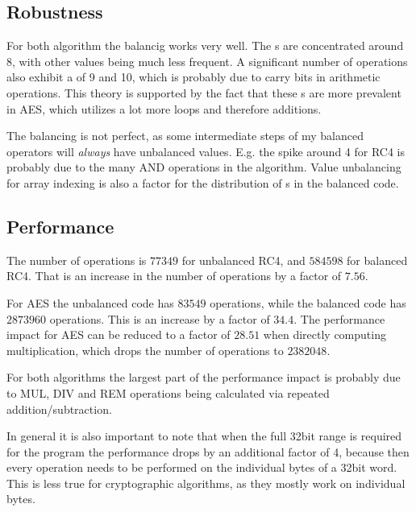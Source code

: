 \subsection{Robustness}
For both algorithm the balancig works very well.
The \hammingw{}s are concentrated around 8, with other values being much less frequent.
A significant number of operations also exhibit a \hammingw{} of 9 and 10, which is probably due to carry bits in arithmetic operations.
This theory is supported by the fact that these \hammingw{}s are more prevalent in AES, which utilizes a lot more loops and therefore additions.

The balancing is not perfect, as some intermediate steps of my balanced operators will \emph{always} have unbalanced values.
E.g. the spike around 4 for RC4 is probably due to the many AND operations in the algorithm.
Value unbalancing for array indexing is also a factor for the distribution of \hammingw{}s in the balanced code.

\subsection{Performance}
The number of operations is $77349$ for unbalanced RC4, and $584598$ for balanced RC4.
That is an increase in the number of operations by a factor of $7.56$.

For AES the unbalanced code has $83549$ operations, while the balanced code has $2873960$ operations.
This is an increase by a factor of $34.4$.
The performance impact for AES can be reduced to a factor of $28.51$ when directly computing multiplication, which drops the number of operations to $2382048$.

For both algorithms the largest part of the performance impact is probably due to MUL, DIV and REM operations being calculated via repeated addition/subtraction.

In general it is also important to note that when the full 32bit range is required for the program the performance drops by an additional factor of 4, because then every operation needs to be performed on the individual bytes of a 32bit word.
This is less true for cryptographic algorithms, as they mostly work on individual bytes.
